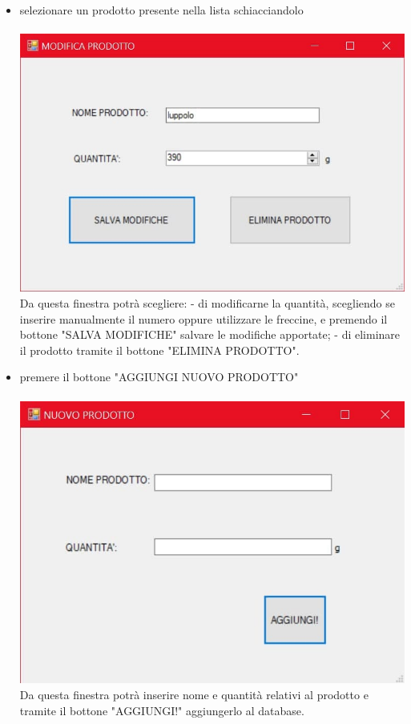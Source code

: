 \documentclass[a4paper, titlepage]{article}
\begin{document}
\begin{itemize}
    \item selezionare un prodotto presente nella lista schiacciandolo\\\\
    \includegraphics[scale=0.30]{Immagini/form/Form ModificaProd.jpg}
    \\Da questa finestra potrà scegliere:
        \subitem - di modificarne la quantità, scegliendo se inserire manualmente il numero oppure utilizzare le freccine, e premendo il bottone "SALVA MODIFICHE" salvare le modifiche apportate;
        \subitem - di eliminare il prodotto tramite il bottone "ELIMINA PRODOTTO".
    \item premere il bottone "AGGIUNGI NUOVO PRODOTTO"\\\\
    \includegraphics[scale=0.30]{Immagini/form/Form AggiuntaProd.jpg}
    \\Da questa finestra potrà inserire nome e quantità relativi al prodotto e tramite il bottone "AGGIUNGI!" aggiungerlo al database.
\end{itemize}
\newpage
\end{document}
